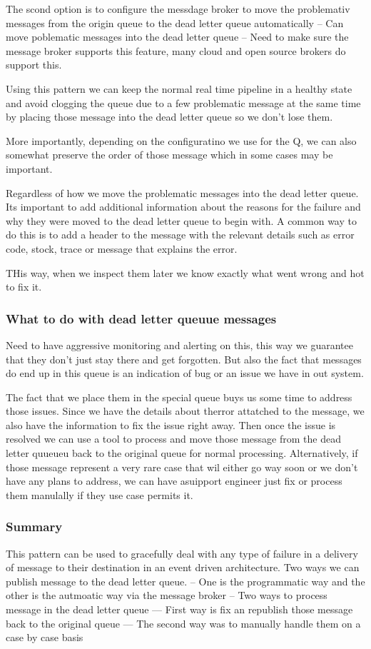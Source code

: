 \documentclass[a4paper, 11pt]{book}
\begin{document}
{    The scond option is to configure the messdage broker to move the problemativ messages from the origin queue to the dead letter queue automatically
    -- Can move poblematic messages into the dead letter queue
    -- Need to make sure the message broker supports this feature, many cloud and open source brokers do support this.

    Using this pattern we can keep the normal real time pipeline in a healthy state and avoid clogging the queue due to a few problematic message at the same time by placing those message into the dead letter queue so we don't lose them.

    More importantly, depending on the configuratino we use for the Q, we can also somewhat preserve the order of those message which in some cases may be important.

    Regardless of how we move the problematic messages into the dead letter queue. Its important to add additional information about the reasons for the failure and why they were moved to the dead letter queue to begin with.
    A common way to do this is to add a header to the message with the relevant details such as error code, stock, trace or message that explains the error.

    THis way, when we inspect them later we know exactly what went wrong and hot to fix it.

    \subsubsection{What to do with dead letter queuue messages}
    Need to have aggressive monitoring and alerting on this, this way we guarantee that they don't just stay there and get forgotten.
    But also the fact that messages do end up in this queue is an indication of bug or an issue we have in out system.

    The fact that we place them in the special queue buys us some time to address those issues.
    Since we have the details about therror attatched to the message, we also have the information to fix the issue right away.
    Then once the issue is resolved we can use a tool to process and move those message from the dead letter quueueu back to the original queue for normal processing.
    Alternatively, if those message represent a very rare case that wil either go way soon or we don't have any plans to address, we can have asuipport engineer just fix or process them manulally if they use case permits it.

    \subsubsection{Summary}
    This pattern can be used to gracefully deal with any type of failure in a delivery of message to their destination in an event driven architecture.
    Two ways we can publish message to the dead letter queue.
    -- One is the programmatic way and the other is the autmoatic way via the message broker
    -- Two ways to process message in the dead letter queue
    --- First way is fix an republish those message back to the original queue
    --- The second way was to manually handle them on a case by case basis


}
\end{document}

